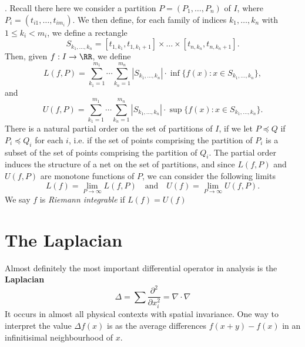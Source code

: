 . Recall there here we consider a partition $P = (P_1, \dots, P_n)$ of $I$, where $P_i = (t_{i1}, \dots, t_{i m_i})$. We then define, for each family of indices $k_1, \dots, k_n$ with $1 \leq k_i < m_i$, we define a rectangle
%
\[ S_{k_1, \dots, k_n} = [t_{1,k_1}, t_{1,k_1+1}] \times \dots \times [t_{n,k_n}, t_{n,k_n+1}]. \]
%
Then, given $f: I \to \RR$, we define
%
\[ L(f,P) = \sum_{k_1 = 1}^{m_1} \cdots \sum_{k_n = 1}^{m_n} |S_{k_1, \dots, k_n}| \cdot \inf \{ f(x) : x \in S_{k_1, \dots, k_n} \}, \]
%
and
%
\[ U(f,P) = \sum_{k_1 = 1}^{m_1} \cdots \sum_{k_n = 1}^{m_n} |S_{k_1, \dots, k_n}| \cdot \sup \{ f(x) : x \in S_{k_1, \dots, k_n} \}. \]
%
There is a natural partial order on the set of partitions of $I$, if we let $P \preceq Q$ if $P_i \preceq Q_i$ for each $i$, i.e. if the set of points comprising the partition of $P_i$ is a subset of the set of points comprising the partition of $Q_i$. The partial order induces the structure of a net on the set of partitions, and since $L(f,P)$ and $U(f,P)$ are monotone functions of $P$, we can consider the following limits
%
\[ L(f) = \lim_{P \to \infty} L(f,P) \quad\text{and}\quad U(f) = \lim_{P \to \infty} U(f,P). \]
%
We say $f$ is \emph{Riemann integrable} if $L(f) = U(f)$

\section{The Laplacian}

Almost definitely the most important differential operator in analysis is the {\bf Laplacian}
%
\[ \Delta = \sum \frac{\partial^2}{\partial x_i^2} = \nabla \cdot \nabla \]
%
It occurs in almost all physical contexts with spatial invariance. One way to interpret the value $\Delta f(x)$ is as the average differences $f(x+y) - f(x)$ in an infinitisimal neighbourhood of $x$.

